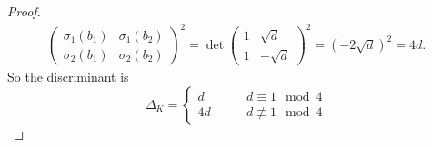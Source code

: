 \documentclass[a4paper]{article}
\begin{document}
\begin{enumerate}
\begin{proof}
\begin{align*}
\begin{pmatrix}
        \sigma_1(b_1) & \sigma_1(b_2) \\
        \sigma_2(b_1) & \sigma_2(b_2)
      \end{pmatrix}^2
      = \det \begin{pmatrix}
        1 & \sqrt{d} \\
        1 & -\sqrt{d}
      \end{pmatrix}^2
      = (-2\sqrt{d})^2 = 4d \text{.}
    \end{align*}
    So the discriminant is
    \begin{equation}
      \Delta_K = \begin{cases}
        d & \qquad d \equiv 1 \mod{4}\\
        4d & \qquad d \not\equiv 1 \mod{4}
      \end{cases}
    \end{equation}
  \end{proof}
\end{enumerate}
\end{document}
